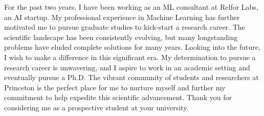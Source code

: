 \documentclass{article}
\begin{document}
For the past two years, I have been working as an ML consultant at Relfor Labs,
an AI startup. My professional experience in Machine Learning has further
motivated me to pursue graduate studies to kick-start a research career. The
scientific landscape has been consistently evolving, but many longstanding
problems have eluded complete solutions for many years. Looking into the future,
I wish to make a difference in this significant era. My determination to pursue
a research career is unwavering, and I aspire to work in an academic setting and
eventually pursue a Ph.D. The vibrant community of students and researchers at
Princeton is the perfect place for me to nurture myself and further my
commitment to help expedite this scientific advancement. Thank you for
considering me as a prospective student at your university.
\end{document}

